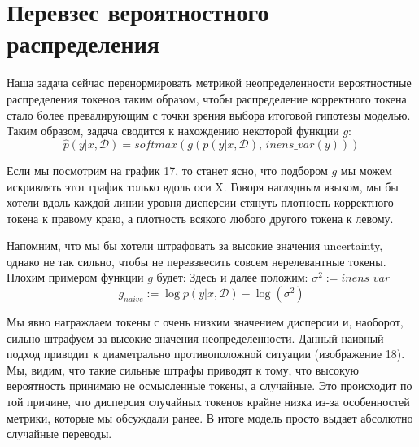 \documentclass[a4paper,14pt]{extarticle}
\begin{document}
\section{Перевзес вероятностного распределения}
	Наша задача сейчас перенормировать метрикой неопределенности вероятностные распределения токенов таким образом, чтобы распределение корректного токена стало более превалирующим с точки зрения выбора итоговой гипотезы моделью. Таким образом, задача сводится к нахождению некоторой функции $g$:
	\begin{equation*}
		\hat{p}(y | x, \mathcal{D}) = softmax(g(p(y | x, \mathcal{D}),\, inens\_var(y)))
	\end{equation*}
	
	Если мы посмотрим на график 17, то станет ясно, что подбором $g$ мы можем искривлять этот график только вдоль оси X. Говоря наглядным языком, мы бы хотели вдоль каждой линии уровня дисперсии стянуть плотность корректного токена к правому краю, а плотность всякого любого другого токена к левому.
	
	\begin{figure}[t]
	\end{figure} 
	
	Напомним, что мы бы хотели штрафовать за высокие значения uncertainty, однако не так сильно, чтобы не перевзвесить совсем нерелевантные токены. Плохим примером функции $g$ будет:
	Здесь и далее положим: $\sigma^2 := inens\_var$
	\begin{equation}
		g_{naive} := \log p(y | x, \mathcal{D}) - \log(\sigma^2)
	\end{equation}
	
	Мы явно награждаем токены с очень низким значением дисперсии и, наоборот, сильно штрафуем за высокие значения неопределенности. Данный наивный подход приводит к диаметрально противоположной ситуации (изображение 18). Мы, видим, что такие сильные штрафы приводят к тому, что высокую вероятность принимаю не осмысленные токены, а случайные. Это происходит по той причине, что дисперсия случайных токенов крайне низка из-за особенностей метрики, которые мы обсуждали ранее. В итоге модель просто выдает абсолютно случайные переводы.
	
\end{document}

